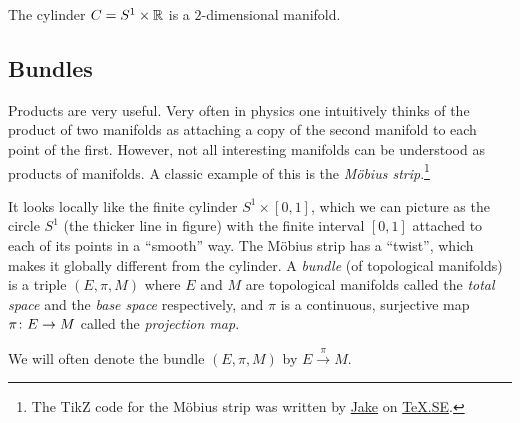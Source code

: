 \be
The cylinder $C=S^1\times \mathbb{R}$ is a $2$-dimensional manifold.
\ee

\subsection{Bundles}

Products are very useful. Very often in physics one intuitively thinks of the product of two manifolds as attaching a copy of the second manifold to each point of the first.  However, not all interesting manifolds can be understood as products of manifolds. A classic example of this is the \emph{M\"obius strip}.\footnote{The TikZ code for the M\"obius strip was written by \href{http://pgfplots.net/tikz/examples/author/jake/}{Jake} on \href{https://tex.stackexchange.com/questions/118563/moebius-strip-using-tikz}{TeX.SE}.}
\vspace{-0.1cm}
\begin{center}
\end{center}
\vspace{-0.6cm}
It looks locally like the finite cylinder $S^1\times [0,1]$, which we can picture as the circle $S^1$ (the thicker line in figure) with the finite interval $[0,1]$ attached to each of its points in a ``smooth'' way. The M\"obius strip has a ``twist'', which makes it globally different from the cylinder.
\bd
A \emph{bundle} (of topological manifolds) is a triple $(E,\pi,M)$ where $E$ and $M$ are topological manifolds called the \emph{total space} and the \emph{base space} respectively, and $\pi$ is a continuous, surjective map $\pi\colon E \to M$ called the \emph{projection map}.
\ed

We will often denote the bundle $(E,\pi,M)$ by $E\xrightarrow{\,\pi\,}M$.

